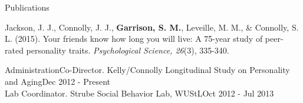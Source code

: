 \documentclass {resume}
\newcommand{\meb}{{\bf Garrison, S. M.}\xspace}
\newlength{\wideitemsep}
\let\olditem\item
\renewcommand{\item}{\setlength{\itemsep}{\wideitemsep}\olditem}
\begin{document}

\begin{rSection}{\textrm{Publications}}%
\begin{etaremune}\item Jackson, J. J., Connolly, J. J., \meb, Leveille, M. M., \& Connolly, S. L. (2015). Your friends know how long you will live: A 75-year study of peer-rated personality traits. \textit{Psychological Science, 26}(3),  335-340.\\ \href{http://pss.sagepub.com/content/early/2015/01/12/0956797614561800.full}{\color{blue}{doi:10.1177/0956797614561800}}
\end{etaremune}\end{rSection}%



\begin{samepage}\begin{rSection}{\textrm{Administration}}Co-Director. Kelly/Connolly Longitudinal Study on Personality and Aging\hfill Dec 2012 - Present\smallskip\\
Lab Coordinator. Strube Social Behavior Lab,  WUStL\hfill Oct 2012 - Jul 2013\end{rSection}\end{samepage}\newpage
\end{document}
